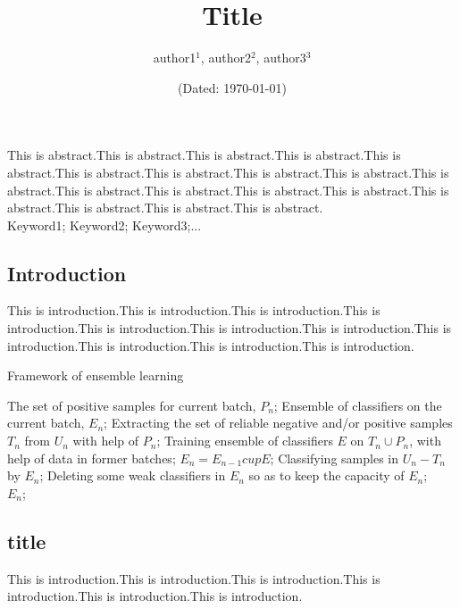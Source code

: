 \documentclass[hyperref]{ctexart}
\title{\textbf{Title}}
\author{\sffamily author1$^1$, \sffamily author2$^2$, \sffamily author3$^3$}
\date{(Dated: \today)}
\begin{document}
    \maketitle
    This is abstract.This is abstract.This is abstract.This is abstract.This is abstract.This is abstract.This is abstract.This is abstract.This is abstract.This is abstract.This is abstract.This is abstract.This is abstract.This is abstract.This is abstract.This is abstract.This is abstract.This is abstract.\\
     
    Keyword1; Keyword2; Keyword3;...
    \begin{multicols}{2}
        \section{Introduction} 
        This is introduction.This is introduction.This is introduction.This is introduction.This is introduction.This is introduction.This is introduction.This is introduction.This is introduction.This is introduction.This is introduction.
        \begin{algorithm}[H]
            \caption{ Framework of ensemble learning}
            \label{alg:Framwork}
            \begin{algorithmic}[1]
                \Require
            The set of positive samples for current batch, $P_n$;
            \Ensure
            Ensemble of classifiers on the current batch, $E_n$;
            \State Extracting the set of reliable negative and/or positive samples $T_n$ from $U_n$ with help of $P_n$;
            \label{code:fram:extract}
            \State Training ensemble of classifiers $E$ on $T_n \cup P_n$, with help of data in former batches;
            \label{code:fram:trainbase}
            \State $E_n=E_{n-1}cup E$;
            \label{code:fram:add}
            \State Classifying samples in $U_n-T_n$ by $E_n$;
            \label{code:fram:classify}
            \State Deleting some weak classifiers in $E_n$ so as to keep the capacity of $E_n$;
            \label{code:fram:select} \\
            \Return $E_n$;
            \end{algorithmic}
        \end{algorithm}
     
        \subsection{title}
        This is introduction.This is introduction.This is introduction.This is introduction.This is introduction.This is introduction.

\end{multicols}
\end{document}
